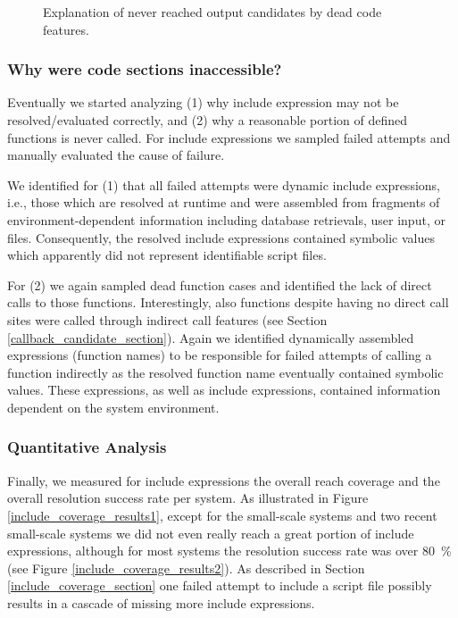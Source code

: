 \documentclass{sig-alternate-05-2015}
\begin{document}
\begin{figure}
	
	\caption{Explanation of never reached output candidates by dead code features.}
	\label{dead_explanations}
\end{figure}

\subsubsection{Why were code sections inaccessible?}  
Eventually we started analyzing (1) why include expression may not be resolved/evaluated correctly, and (2) why a reasonable portion of defined functions is never called. For include expressions we  sampled failed attempts and manually evaluated the cause of failure. 

We identified for (1) that all failed attempts were dynamic include expressions, i.e., those which are resolved at runtime and were assembled from fragments of environment-dependent information including database retrievals, user input, or files. Consequently, the resolved include expressions contained symbolic values which apparently did not represent identifiable script files.

For (2) we again sampled dead function cases and identified the lack of direct calls to those functions. Interestingly, also functions despite having no direct call sites were called through indirect call features (see Section \ref{callback_candidate_section}). Again we identified dynamically assembled expressions (function names) to be responsible for failed attempts of calling a function indirectly as the resolved function name eventually contained symbolic values. These expressions, as well as include expressions, contained information dependent on the system environment.

\subsubsection{Quantitative Analysis}
Finally, we measured for include expressions the overall reach coverage and the overall resolution success rate per system. As illustrated in Figure \ref{include_coverage_results1}, except for the small-scale systems and two recent small-scale systems we did not even really reach a great portion of include expressions, although for most systems the resolution success rate was over 80~\% (see Figure \ref{include_coverage_results2}). As described in Section \ref{include_coverage_section} one failed attempt to include a script file possibly results in a cascade of missing more include expressions.
\end{document}
